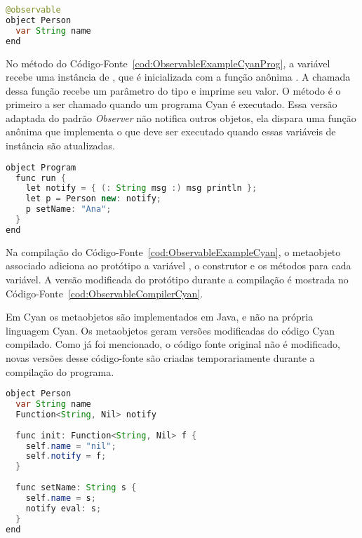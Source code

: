 \begin{lstlisting}[language=Java, caption={Protótipo marcado com a anotação \textbf{@observable}}, label={cod:ObservableExampleCyan}]
@observable
object Person
  var String name
end
\end{lstlisting}

No método  do Código-Fonte~\ref{cod:ObservableExampleCyanProg}, a variável  recebe uma instância de , que é inicializada com a função anônima . A chamada dessa função recebe um parâmetro do tipo  e imprime seu valor. O método  é o primeiro a ser chamado quando um programa Cyan é executado. Essa versão adaptada do padrão \emph{Observer} não notifica outros objetos, ela dispara uma função anônima que implementa o que deve ser executado quando essas variáveis de instância são atualizadas.

\begin{lstlisting}[language=Java, caption={Exemplo de uso do prótotipo \textbf{Person}}, label={cod:ObservableExampleCyanProg}]
object Program
  func run {
    let notify = { (: String msg :) msg println };
    let p = Person new: notify;
    p setName: "Ana";
  }
end
\end{lstlisting}

Na compilação do Código-Fonte~\ref{cod:ObservableExampleCyan}, o metaobjeto associado adiciona ao protótipo  a variável , o construtor  e os métodos  para cada variável. A versão modificada do protótipo  durante a compilação é mostrada no Código-Fonte~\ref{cod:ObservableCompilerCyan}.

Em Cyan os metaobjetos são implementados em Java, e não na própria linguagem Cyan. Os metaobjetos geram versões modificadas do código Cyan compilado. Como já foi mencionado, o código fonte original não é modificado, novas versões desse código-fonte são criadas temporariamente durante a compilação do programa.

\begin{lstlisting}[language=Java, caption={\textbf{Person} gerado durante a compilação}, label={cod:ObservableCompilerCyan}]
object Person
  var String name
  Function<String, Nil> notify
  
  func init: Function<String, Nil> f {
    self.name = "nil";
    self.notify = f;
  }
  
  func setName: String s {
    self.name = s;
    notify eval: s;
  }
end
\end{lstlisting}

